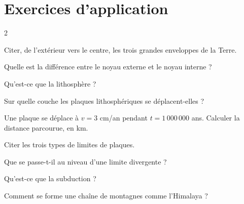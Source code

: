 \section{Exercices d'application}
\begin{multicols}{2}

\exo{} Citer, de l'extérieur vers le centre, les trois grandes enveloppes de la
Terre.

\exo{} Quelle est la différence entre le noyau externe et le noyau interne ?

\exo{} Qu'est-ce que la lithosphère ?

\exo{} Sur quelle couche les plaques lithosphériques se déplacent-elles ?

\exo{} Une plaque se déplace à $v=3$ cm/an pendant $t=1\,000\,000$ ans.
Calculer la distance parcourue, en km.

\exo{} Citer les trois types de limites de plaques.

\exo{} Que se passe-t-il au niveau d'une limite divergente ?

\exo{} Qu'est-ce que la subduction ?

\exo{} Comment se forme une chaîne de montagnes comme l'Himalaya ?

\end{multicols}


